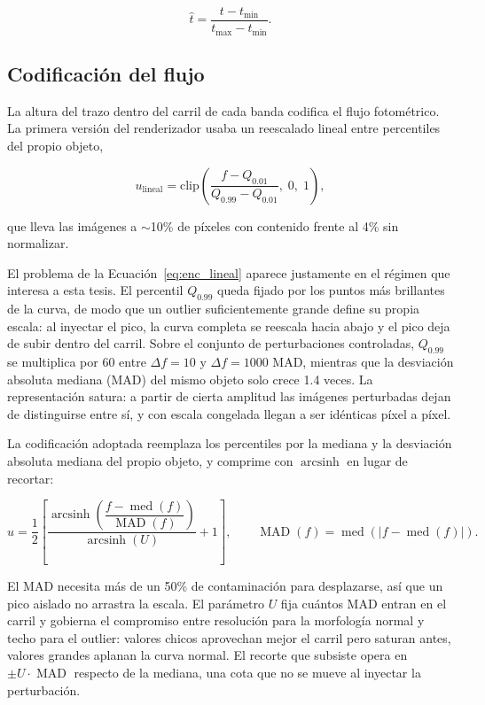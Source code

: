 \begin{equation}
\hat{t} = \frac{t - t_{\min}}{t_{\max} - t_{\min}}.
\end{equation}

\subsection{Codificación del flujo}
\label{sec:codificacion_flujo}

La altura del trazo dentro del carril de cada banda codifica el flujo fotométrico. La primera versión del renderizador usaba un reescalado lineal entre percentiles del propio objeto,

\begin{equation}
u_{\text{lineal}} = \mathrm{clip}\!\left(\frac{f - Q_{0.01}}{Q_{0.99} - Q_{0.01}},\; 0,\; 1\right),
\label{eq:enc_lineal}
\end{equation}

que lleva las imágenes a $\sim$10\% de píxeles con contenido frente al 4\% sin normalizar.

El problema de la Ecuación~\ref{eq:enc_lineal} aparece justamente en el régimen que interesa a esta tesis. El percentil $Q_{0.99}$ queda fijado por los puntos más brillantes de la curva, de modo que un outlier suficientemente grande define su propia escala: al inyectar el pico, la curva completa se reescala hacia abajo y el pico deja de subir dentro del carril. Sobre el conjunto de perturbaciones controladas, $Q_{0.99}$ se multiplica por 60 entre $\Delta f = 10$ y $\Delta f = 1000$ MAD, mientras que la desviación absoluta mediana (MAD) del mismo objeto solo crece 1.4 veces. La representación satura: a partir de cierta amplitud las imágenes perturbadas dejan de distinguirse entre sí, y con escala congelada llegan a ser idénticas píxel a píxel.

La codificación adoptada reemplaza los percentiles por la mediana y la desviación absoluta mediana del propio objeto, y comprime con $\operatorname{arcsinh}$ en lugar de recortar:

\begin{equation}
u = \frac{1}{2}\left[
\frac{\operatorname{arcsinh}\!\left(\dfrac{f - \operatorname{med}(f)}{\operatorname{MAD}(f)}\right)}
{\operatorname{arcsinh}(U)} + 1
\right],
\qquad
\operatorname{MAD}(f) = \operatorname{med}\left(\left|f - \operatorname{med}(f)\right|\right).
\label{eq:enc_mad}
\end{equation}

El MAD necesita más de un 50\% de contaminación para desplazarse, así que un pico aislado no arrastra la escala. El parámetro $U$ fija cuántos MAD entran en el carril y gobierna el compromiso entre resolución para la morfología normal y techo para el outlier: valores chicos aprovechan mejor el carril pero saturan antes, valores grandes aplanan la curva normal. El recorte que subsiste opera en $\pm U \cdot \operatorname{MAD}$ respecto de la mediana, una cota que no se mueve al inyectar la perturbación.

